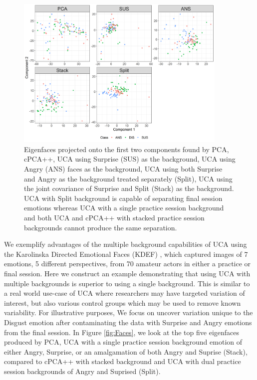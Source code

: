 \documentclass[12pt]{article}
\begin{document}
\begin{figure}[!th]
  \centering
  \includegraphics[width = 0.9\textwidth]{figure/F_Surprise_Angry_Disgust_projected.png}
  \caption{Eigenfaces projected onto the first two components found by PCA, cPCA++, UCA using Surprise (SUS) as the background, UCA using Angry (ANS) faces as the background, UCA using both Surprise and Angry as the background treated separately (Split), UCA using the joint covariance of Surprise and Split (Stack) as the background. UCA with Split background is capable of separating final session emotions whereas UCA with a single practice session background and both UCA and cPCA++ with stacked practice session backgrounds cannot produce the same separation.}
  \label{fig:Face_Projections}
\end{figure}
We exemplify advantages of the multiple background capabilities of UCA using the Karolinska Directed Emotional Faces (KDEF) \cite{Calvo2008}, which captured images of 7 emotions, 5 different perspectives, from 70 amateur actors in either a practice or final session.
Here we construct an example demonstrating that using UCA with multiple backgrounds is superior to using a single background. 
This is similar to a real world use-case of UCA where researchers may have targeted variation of interest, but also various control groups which may be used to remove known variability.
For illustrative purposes, We focus on  uncover variation unique to the Disgust emotion after contaminating the data with Surprise and Angry emotions from the final session. 
In Figure \ref{fig:Faces}, we look at the top five eigenfaces produced by PCA, UCA with a single practice session background emotion of either Angry, Surprise, or an amalgamation of both Angry and Suprise (Stack), compared to cPCA++ with stacked background and UCA with dual practice session backgrounds of Angry and Suprised (Split). 
\end{document}
